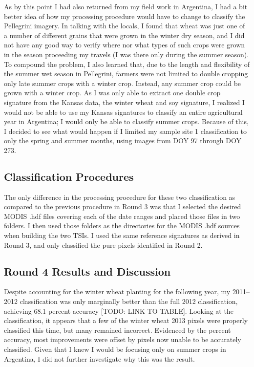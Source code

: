 As by this point I had also returned from my field work in Argentina, I had a bit better idea of how my processing procedure would have to change to classify the Pellegrini imagery. In talking with the locals, I found that wheat was just one of a number of different grains that were grown in the winter dry season, and I did not have any good way to verify where nor what types of such crops were grown in the season proceeding my travels (I was there only during the summer season). To compound the problem, I also learned that, due to the length and flexibility of the summer wet season in Pellegrini, farmers were not limited to double cropping only late summer crops with a winter crop. Instead, any summer crop could be grown with a winter crop. As I was only able to extract one double crop signature from the Kansas data, the winter wheat and soy signature, I realized I would not be able to use my Kansas signatures to classify an entire agricultural year in Argentina; I would only be able to classify summer crops. Because of this, I decided to see what would happen if I limited my sample site 1 classification to only the spring and summer months, using images from DOY 97 through DOY 273.

\subsection*{Classification Procedures}

The only difference in the processing procedure for these two classification as compared to the previous procedure in Round 3 was that I selected the desired MODIS .hdf files covering each of the date ranges and placed those files in two folders. I then used those folders as the directories for the MODIS .hdf sources when building the two TSIs. I used the same reference signatures as derived in Round 3, and only classified the pure pixels identified in Round 2.

\subsection*{Round 4 Results and Discussion}

Despite accounting for the winter wheat planting for the following year, my 2011--2012 classification was only marginally better than the full 2012 classification, achieving 68.1 percent accuracy [TODO: LINK TO TABLE]. Looking at the classification, it appears that a few of the winter wheat 2013 pixels were properly classified this time, but many remained incorrect. Evidenced by the percent accuracy, most improvements were offset by pixels now unable to be accurately classified. Given that I knew I would be focusing only on summer crops in Argentina, I did not further investigate why this was the result.

